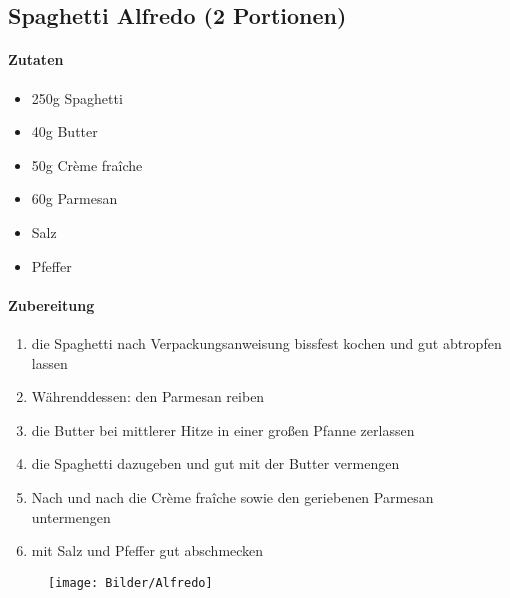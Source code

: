\newpage
\subsection{Spaghetti Alfredo (2 Portionen)}
\paragraph{Zutaten}
\begin{itemize}[noitemsep]
	\item 250g Spaghetti
	\item 40g Butter
	\item 50g Crème fraîche 
	\item 60g Parmesan
	\item Salz
	\item Pfeffer
\end{itemize}
\paragraph{Zubereitung}
\begin{enumerate}[noitemsep]
	\item die Spaghetti nach Verpackungsanweisung bissfest kochen und gut abtropfen lassen
	\item Währenddessen: den Parmesan reiben
	\item die Butter bei mittlerer Hitze in einer großen Pfanne zerlassen
	\item die Spaghetti dazugeben und gut mit der Butter vermengen
	\item Nach und nach die Crème fraîche sowie den geriebenen Parmesan untermengen
	\item mit Salz und Pfeffer gut abschmecken
\end{enumerate}
\begin{figure}[h]
\centering
\texttt{[image: Bilder/Alfredo]}
\end{figure}
